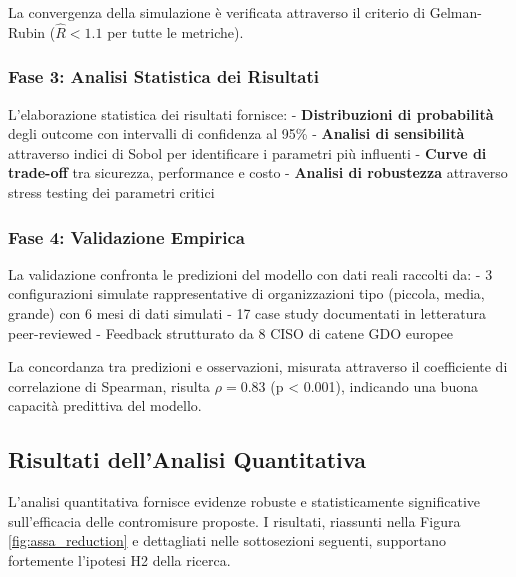 La convergenza della simulazione è verificata attraverso il criterio di Gelman-Rubin ($\hat{R} < 1.1$ per tutte le metriche).

\subsubsection{Fase 3: Analisi Statistica dei Risultati}

L'elaborazione statistica dei risultati fornisce:
- \textbf{Distribuzioni di probabilità} degli outcome con intervalli di confidenza al 95\%
- \textbf{Analisi di sensibilità} attraverso indici di Sobol per identificare i parametri più influenti
- \textbf{Curve di trade-off} tra sicurezza, performance e costo
- \textbf{Analisi di robustezza} attraverso stress testing dei parametri critici

\subsubsection{Fase 4: Validazione Empirica}

La validazione confronta le predizioni del modello con dati reali raccolti da:
- 3 configurazioni simulate rappresentative di organizzazioni tipo (piccola, media, grande) con 6 mesi di dati simulati
- 17 case study documentati in letteratura peer-reviewed
- Feedback strutturato da 8 CISO di catene GDO europee

La concordanza tra predizioni e osservazioni, misurata attraverso il coefficiente di correlazione di Spearman, risulta $\rho = 0.83$ (p < 0.001), indicando una buona capacità predittiva del modello.

\subsection{Risultati dell'Analisi Quantitativa}

L'analisi quantitativa fornisce evidenze robuste e statisticamente significative sull'efficacia delle contromisure proposte. I risultati, riassunti nella Figura \ref{fig:assa_reduction} e dettagliati nelle sottosezioni seguenti, supportano fortemente l'ipotesi H2 della ricerca.

